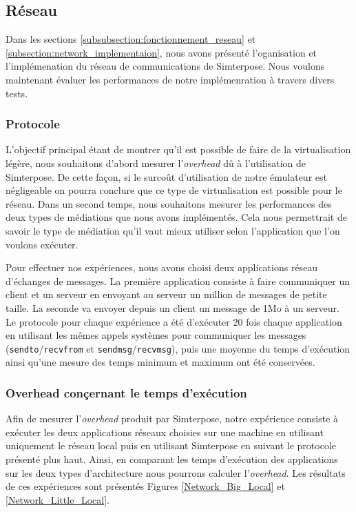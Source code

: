 \subsection{Réseau}
\label{subsection:res}

Dans les sections \ref{subsubsection:fonctionnement_reseau} et \ref{subsection:network_implementaion}, nous avons présenté l'oganisation et l'implémenation du réseau de communications de Simterpose. Nous voulons maintenant évaluer les performances de notre implémenration à travers divers tests.

\subsubsection{Protocole}
L'objectif principal étant de montrer qu'il est possible de faire de la virtualisation légère, nous souhaitons d'abord mesurer l'\textit{overhead} dû à l'utilisation de Simterpose. De cette façon, si le surcoût d'utilisation de notre émulateur est négligeable on pourra conclure que ce type de virtualisation est possible pour le réseau. Dans un second temps, nous souhaitons mesurer les performances des deux types de médiations que nous avons implémentés. Cela nous permettrait de savoir le type de médiation qu'il vaut mieux utiliser selon l'application que l'on voulons exécuter.

Pour effectuer nos expériences, nous avons choisi deux applications réseau d'échanges de messages. La première application consiste à faire communiquer un client et un serveur en envoyant au serveur un million de messages de petite taille. La seconde va envoyer depuis un client un message de 1Mo à un serveur. Le protocole pour chaque expérience a été d'exécuter 20 fois chaque application en utilisant les mêmes appels systèmes pour communiquer les messages (\texttt{sendto}/\texttt{recvfrom} et \texttt{sendmsg}/\texttt{recvmsg}), puis une moyenne du temps d'exécution ainsi qu'une mesure des temps minimum et maximum ont été conservées.

\subsubsection{Overhead conçernant le temps d'exécution}
Afin de mesurer l'\textit{overhead} produit par Simterpose, notre expérience consiste à exécuter les deux applications réseaux choisies sur une machine en utilisant uniquement le réseau local puis en utilisant Simterpose en suivant le protocole présenté plus haut. Ainsi, en comparant les temps d'exécution des applications sur les deux types d'architecture nous pourrons calculer l'\textit{overhead}. Les résultats de ces expériences sont présentés Figures \ref{Network_Big_Local} et \ref{Network_Little_Local}.

